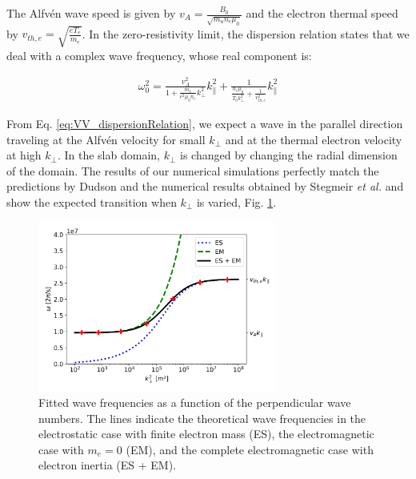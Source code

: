 The Alfvén wave speed is given by $v_A = \frac{B_0}{\sqrt{m_u n_e \mu_0}}$ and the electron thermal speed by $v_{th,e} = \sqrt{\frac{e T_e}{m_e}}$. In the zero-resistivity limit, the dispersion relation states that we deal with a complex wave frequency, whose real component is: \newline

\begin{align}
	\label{eq:VV_dispersionRelation}
	\omega_0^2 = \frac{v_A^2}{1 + \frac{m_e}{e^2 \mu_0 n_e} k_\perp^2} k_\parallel^2 + \frac{1}{\frac{n_e \mu_0}{T_0 k_\perp^2} + \frac{1}{v_{th,e}^2}} k_\parallel^2  
\end{align}

From Eq. \ref{eq:VV_dispersionRelation}, we expect a wave in the parallel direction traveling at the Alfvén velocity for small $k_\perp$ and at the thermal electron velocity at high $k_\perp$. In the slab domain, $k_\perp$ is changed by changing the radial dimension of the domain. The results of our numerical simulations perfectly match the predictions by Dudson \cite{Dudson2021} and the numerical results obtained by Stegmeir \emph{et al.} \cite{stegmeir2019} and show the expected transition when $k_\perp$ is varied, Fig. \ref{fig:transitionSLAB}. \newline

\begin{figure}[h]\centering
	\centering
	\includegraphics[width=0.7\textwidth]{schemes/transitionAlfvenThermal.png}
	\caption{Fitted wave frequencies as a function of the perpendicular wave numbers. The lines indicate the theoretical wave frequencies in the electrostatic case with finite electron mass (ES), the electromagnetic case with $m_e = 0$ (EM), and the complete electromagnetic case with electron inertia (ES + EM).}
	\label{fig:transitionSLAB}
\end{figure}




